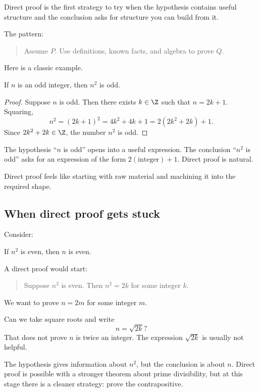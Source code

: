 Direct proof is the first strategy to try when the hypothesis contains useful structure and the conclusion asks for structure you can build from it.

The pattern:

\begin{quote}
Assume $P$. Use definitions, known facts, and algebra to prove $Q$.
\end{quote}

Here is a classic example.

\begin{theorem}
If $n$ is an odd integer, then $n^2$ is odd.
\end{theorem}

\begin{proof}
Suppose $n$ is odd. Then there exists $k\in\Z$ such that $n=2k+1$. Squaring,
\[
n^2=(2k+1)^2=4k^2+4k+1=2(2k^2+2k)+1.
\]
Since $2k^2+2k\in\Z$, the number $n^2$ is odd.
\end{proof}

The hypothesis ``$n$ is odd'' opens into a useful expression. The conclusion ``$n^2$ is odd'' asks for an expression of the form $2(\text{integer})+1$. Direct proof is natural.

\begin{intuitionbox}
Direct proof feels like starting with raw material and machining it into the required shape.
\end{intuitionbox}

\subsection{When direct proof gets stuck}

Consider:

\begin{theorem}
If $n^2$ is even, then $n$ is even.
\end{theorem}

A direct proof would start:

\begin{quote}
Suppose $n^2$ is even. Then $n^2=2k$ for some integer $k$.
\end{quote}

We want to prove $n=2m$ for some integer $m$.

Can we take square roots and write
\[
n=\sqrt{2k}?
\]
That does not prove $n$ is twice an integer. The expression $\sqrt{2k}$ is usually not helpful.

The hypothesis gives information about $n^2$, but the conclusion is about $n$. Direct proof is possible with a stronger theorem about prime divisibility, but at this stage there is a cleaner strategy: prove the contrapositive.

